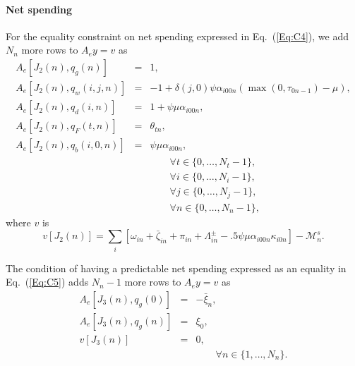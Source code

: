 \documentclass{report}[fleqn,12pt]
\begin{document}
\paragraph*{Net spending}
For the equality constraint on net spending expressed in Eq.~(\ref{Eq:C4}),
we add $N_n$ more rows to $A_ey = v$ as
\begin{eqnarray}
	A_e[J_2(n), q_g(n)] &=& 1, \nonumber \\
	A_e[J_2(n), q_w(i, j ,n)] &=& -1 + \delta(j, 0)\psi\alpha_{i00n}(\max(0, \tau_{0n-1}) - \mu), \nonumber \\
	A_e[J_2(n), q_d(i, n)] &=& 1 + \psi\mu\alpha_{i00n}, \nonumber \\
	A_e[J_2(n), q_F(t, n)] &=& \theta_{t n}, \nonumber \\
	A_e[J_2(n), q_b(i, 0, n)] &=& \psi\mu\alpha_{i00n}, \nonumber \\
	&&\qquad\forall t \in \{0,\ldots, N_t-1\},\nonumber\\
	&&\qquad\forall i \in \{0,\ldots, N_i-1\},\nonumber\\
	&&\qquad\forall j \in \{0,\ldots, N_j-1\},\nonumber\\
	&&\qquad\forall n \in \{0,\ldots, N_n-1\}, \nonumber
\end{eqnarray}
where $v$ is
\begin{equation}
	v[J_2(n)] = \sum_i [\omega_{in} + \bar\zeta_{in} + \pi_{in}
	+ \Lambda^\pm_{in} - .5\psi\mu\alpha_{i00n}\kappa_{i0n}] - \mathcal{M}_n^s.
\end{equation}

The condition of having a predictable net spending expressed as an
equality in Eq.~(\ref{Eq:C5}) adds $N_n-1$ more rows to $A_ey = v$ as
\begin{eqnarray}
	A_e[J_3(n), q_g(0)] &=& -\bar{\xi}_n, \nonumber \\
	A_e[J_3(n), q_g(n)] &=& \xi_0, \nonumber \\
	v[J_3(n)] &=& 0, \\
	&&\qquad\forall n \in \{1,\ldots, N_n\}. \nonumber
\end{eqnarray}
\end{document}
